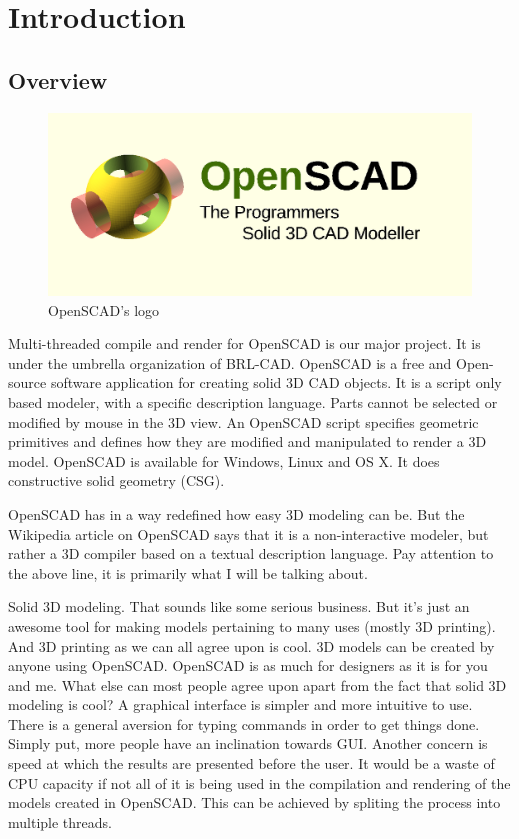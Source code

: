 \chapter{Introduction}


\section{Overview}
\begin{figure}[H] 
	\centering \includegraphics[scale=0.31]{images/openscad.png}
	\caption{OpenSCAD's logo}
	\label{fig:openscadlogo}
\end{figure}
Multi-threaded compile and render for OpenSCAD is our major project. It is under the umbrella organization of BRL-CAD. OpenSCAD is a free and Open-source software application for creating solid 3D CAD objects. It is a script only based modeler, with a specific description language. Parts cannot be selected or modified by mouse in the 3D view. An OpenSCAD script specifies geometric primitives and defines how they are modified and manipulated to render a 3D model. OpenSCAD is available for Windows, Linux and OS X. It does constructive solid geometry (CSG).

OpenSCAD has in a way redefined how easy 3D modeling can be. But the Wikipedia article on OpenSCAD says that it is a non-interactive modeler, but rather a 3D compiler based on a textual description language. Pay attention to the above line, it is primarily what I will be talking about.

Solid 3D modeling. That sounds like some serious business. But it's just an awesome tool for making models pertaining to many uses (mostly 3D printing). And 3D printing as we can all agree upon is cool. 3D models can be created by anyone using OpenSCAD. OpenSCAD is as much for designers as it is for you and me. What else can most people agree upon apart from the fact that solid 3D modeling is cool? A graphical interface is simpler and more intuitive to use. There is a general aversion for typing commands in order to get things done. Simply put, more people have an inclination towards GUI. Another concern is speed at which the results are presented before the user. It would be a waste of CPU capacity if not all of it is being used in the compilation and rendering of the models created in OpenSCAD. This can be achieved by spliting the process into multiple threads.

